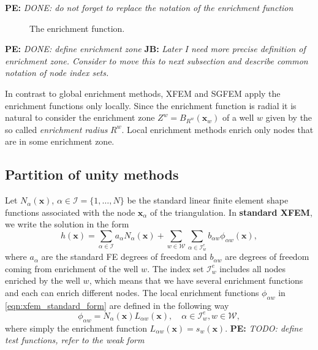 \documentclass[preprint,12pt]{elsarticle}
\newcommand{\figpath}{../graphics/}
\def\vc#1{\mathbf{\boldsymbol{#1}}}     %
\newcommand{\bx}{\vc{x}}
\newcommand{\noteJB}[1]{{\color{Blue} \textbf{JB: } \textit{#1}}}
\newcommand{\notePE}[1]{{\color{Orange} \textbf{PE: } \textit{#1}}}
\begin{document}
\notePE{DONE: do not forget to replace the notation of the enrichment function}
\begin{figure}[!htb]
  \begin{center}         
    \def\svgwidth{0.5\textwidth}
    
  \end{center}
  \caption{The enrichment function.}
  \label{fig:enrich_func}
\end{figure}

\notePE{DONE: define enrichment zone}
\noteJB{Later I need more precise definition of enrichment zone. Consider to move this to next subsection and describe common notation of node index sets.}

In contrast to global enrichment methods, XFEM and SGFEM apply the enrichment functions only locally. Since the enrichment function is radial it is natural
to consider the enrichment zone $Z^w = B_{R^w}(\vc x_w)$ of a well $w$ given by the so called \emph{enrichment radius} $R^w$. Local enrichment methods enrich only 
nodes that are in some enrichment zone.

    
\subsection{Partition of unity methods}
Let $N_\alpha(\bx)$, $\alpha\in\mathcal{I}=\{1,\ldots,N\}$ be the standard linear finite element shape 
functions associated with the node $\bx_\alpha$ of the triangulation. 
In \textbf{standard XFEM}, we write the solution in the form
\begin{equation} \label{eqn:xfem_standard_form}
  h(\bx) = \sum \limits_{\alpha\in\mathcal{I}}a_\alpha N_\alpha(\bx)
    + \sum \limits_{w\in\mathcal{W}} \sum \limits_{\alpha\in\mathcal{I}^e_w} b_{\alpha w} \phi_{\alpha w}(\bx),
\end{equation}
where $a_\alpha$ are the standard FE degrees of freedom and $b_{\alpha w}$ are degrees of freedom coming from
enrichment of the well $w$. The index set $\mathcal{I}^e_w$ includes all nodes enriched by the well $w$, which
means that we have several enrichment functions and each can enrich different nodes.
The local enrichment functions $\phi_{\alpha w}$ in \eqref{eqn:xfem_standard_form} are defined
in the following way
\begin{equation} \label{eqn:xfem_enrich}
    \phi_{\alpha w} = N_\alpha(\bx)L_{\alpha w}(\bx), \quad \alpha\in\mathcal{I}^e_w, w\in\mathcal{W},
\end{equation}
where simply the enrichment function $L_{\alpha w}(\bx) = s_w(\bx)$.
\notePE{TODO: define test functions, refer to the weak form}
\end{document}
